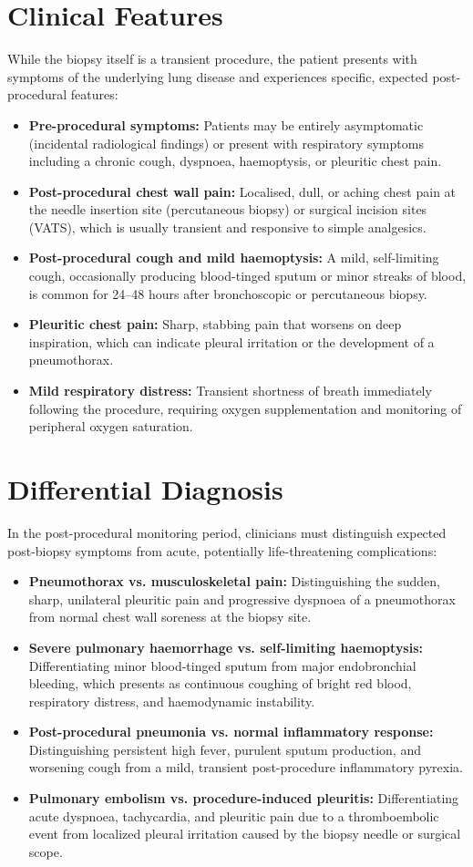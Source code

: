 \section*{Clinical Features}
While the biopsy itself is a transient procedure, the patient presents with symptoms of the underlying lung disease and experiences specific, expected post-procedural features:
\begin{itemize}
    \item \textbf{Pre-procedural symptoms:} Patients may be entirely asymptomatic (incidental radiological findings) or present with respiratory symptoms including a chronic cough, dyspnoea, haemoptysis, or pleuritic chest pain.
    \item \textbf{Post-procedural chest wall pain:} Localised, dull, or aching chest pain at the needle insertion site (percutaneous biopsy) or surgical incision sites (VATS), which is usually transient and responsive to simple analgesics.
    \item \textbf{Post-procedural cough and mild haemoptysis:} A mild, self-limiting cough, occasionally producing blood-tinged sputum or minor streaks of blood, is common for 24--48 hours after bronchoscopic or percutaneous biopsy.
    \item \textbf{Pleuritic chest pain:} Sharp, stabbing pain that worsens on deep inspiration, which can indicate pleural irritation or the development of a pneumothorax.
    \item \textbf{Mild respiratory distress:} Transient shortness of breath immediately following the procedure, requiring oxygen supplementation and monitoring of peripheral oxygen saturation.
\end{itemize}

\section*{Differential Diagnosis}
In the post-procedural monitoring period, clinicians must distinguish expected post-biopsy symptoms from acute, potentially life-threatening complications:
\begin{itemize}
    \item \textbf{Pneumothorax vs. musculoskeletal pain:} Distinguishing the sudden, sharp, unilateral pleuritic pain and progressive dyspnoea of a pneumothorax from normal chest wall soreness at the biopsy site.
    \item \textbf{Severe pulmonary haemorrhage vs. self-limiting haemoptysis:} Differentiating minor blood-tinged sputum from major endobronchial bleeding, which presents as continuous coughing of bright red blood, respiratory distress, and haemodynamic instability.
    \item \textbf{Post-procedural pneumonia vs. normal inflammatory response:} Distinguishing persistent high fever, purulent sputum production, and worsening cough from a mild, transient post-procedure inflammatory pyrexia.
    \item \textbf{Pulmonary embolism vs. procedure-induced pleuritis:} Differentiating acute dyspnoea, tachycardia, and pleuritic pain due to a thromboembolic event from localized pleural irritation caused by the biopsy needle or surgical scope.
\end{itemize}

